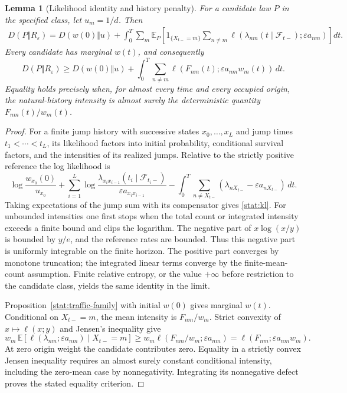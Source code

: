 \documentclass[11pt,oneside,openany]{book}
\newtheorem{lemma}[theorem]{Lemma}
\theoremstyle{definition}
\theoremstyle{remark}\newtheorem{remark}[theorem]{Remark}
\begin{document}
\begin{lemma}[Likelihood identity and history penalty]
\label{stat:entropy-identity}
For a candidate law $P$ in the specified class, let $u_m=1/d$. Then
\begin{align}\label{stat:kl}
 D(P\Vert R_\varepsilon)
  =D(w(0)\Vert u)+
   \int_0^T\sum_{m}\mathbb E_P\!\left[
    1_{\{X_{t-}=m\}}\sum_{n\ne m}
    \ell(\lambda_{nm}(t\mid\mathcal F_{t-});
                    \varepsilon a_{nm})\right]dt.
\end{align}
Every candidate has marginal $w(t)$, and consequently
\begin{equation}\label{stat:jensen}
 D(P\Vert R_\varepsilon)\geq D(w(0)\Vert u)
 +\int_0^T\sum_{n\ne m}
       \ell(F_{nm}(t);\varepsilon a_{nm}w_m(t))\,dt.
\end{equation}
Equality holds precisely when, for almost every time and every occupied
origin, the natural-history intensity is almost surely the deterministic
quantity $F_{nm}(t)/w_m(t)$.
\end{lemma}
\begin{proof}
For a finite jump history with successive states $x_0,\ldots,x_L$ and jump
times $t_1<\cdots<t_L$, its likelihood factors into initial probability,
conditional survival factors, and the intensities of its realized jumps.
Relative to the strictly positive reference the log likelihood is
\[
 \log\frac{w_{x_0}(0)}{u_{x_0}}
 +\sum_{i=1}^L\log
       \frac{\lambda_{x_i x_{i-1}}(t_i\mid\mathcal F_{t_i-})}
            {\varepsilon a_{x_i x_{i-1}}}
 -\int_0^T\sum_{n\ne X_{t-}}
        (\lambda_{nX_{t-}}-\varepsilon a_{nX_{t-}})\,dt.
\]
Taking expectations of the jump sum with its compensator gives
\eqref{stat:kl}. For unbounded intensities one first stops when the total
count or integrated intensity exceeds a finite bound and clips the
logarithm. The negative part of $x\log(x/y)$ is bounded by $y/e$, and the
reference rates are bounded. Thus this negative part is uniformly
integrable on the finite horizon. The positive part converges by monotone
truncation; the integrated linear terms converge by the finite-mean-count
assumption. Finite relative entropy, or the value $+\infty$ before
restriction to the candidate class, yields the same identity in the limit.

Proposition~\ref{stat:traffic-family} with initial $w(0)$ gives marginal
$w(t)$. Conditional on $X_{t-}=m$, the mean intensity is $F_{nm}/w_m$.
Strict convexity of $x\mapsto\ell(x;y)$ and Jensen's inequality give
\[
 w_m\,\mathbb E[\ell(\lambda_{nm};\varepsilon a_{nm})\mid X_{t-}=m]
 \geq w_m\ell(F_{nm}/w_m;\varepsilon a_{nm})
 =\ell(F_{nm};\varepsilon a_{nm}w_m).
\]
At zero origin weight the candidate contributes zero. Equality in a
strictly convex Jensen inequality requires an almost surely constant
conditional intensity, including the zero-mean case by nonnegativity.
Integrating its nonnegative defect proves the stated equality criterion.
\end{proof}
\end{document}
